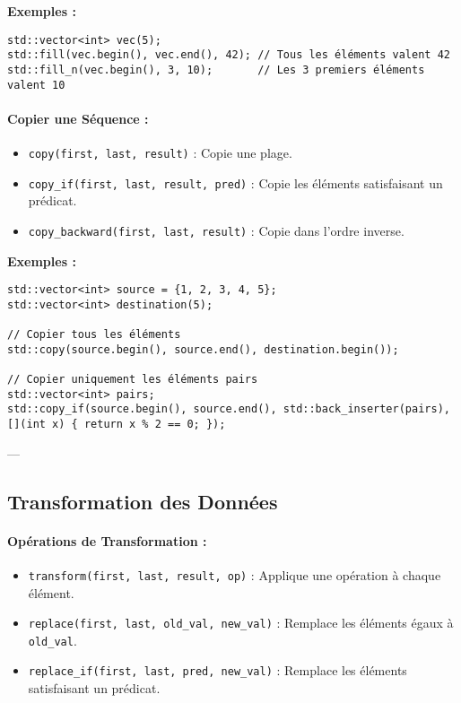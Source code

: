 \textbf{Exemples :}
\begin{tcolorbox}[colframe=blue!50!black, colback=blue!5!white, title=Exemples de Remplissage]
\begin{verbatim}
std::vector<int> vec(5);
std::fill(vec.begin(), vec.end(), 42); // Tous les éléments valent 42
std::fill_n(vec.begin(), 3, 10);       // Les 3 premiers éléments valent 10
\end{verbatim}
\end{tcolorbox}

\paragraph{Copier une Séquence :}
\begin{itemize}
    \item \texttt{copy(first, last, result)} : Copie une plage.
    \item \texttt{copy\_if(first, last, result, pred)} : Copie les éléments satisfaisant un prédicat.
    \item \texttt{copy\_backward(first, last, result)} : Copie dans l’ordre inverse.
\end{itemize}

\textbf{Exemples :}
\begin{tcolorbox}[colframe=blue!50!black, colback=blue!5!white, title=Exemples de Copie]
\begin{verbatim}
std::vector<int> source = {1, 2, 3, 4, 5};
std::vector<int> destination(5);

// Copier tous les éléments
std::copy(source.begin(), source.end(), destination.begin());

// Copier uniquement les éléments pairs
std::vector<int> pairs;
std::copy_if(source.begin(), source.end(), std::back_inserter(pairs), [](int x) { return x % 2 == 0; });
\end{verbatim}
\end{tcolorbox}

---

\subsection{ Transformation des Données}
\paragraph{Opérations de Transformation :}
\begin{itemize}
    \item \texttt{transform(first, last, result, op)} : Applique une opération à chaque élément.
    \item \texttt{replace(first, last, old\_val, new\_val)} : Remplace les éléments égaux à \texttt{old\_val}.
    \item \texttt{replace\_if(first, last, pred, new\_val)} : Remplace les éléments satisfaisant un prédicat.
\end{itemize}

